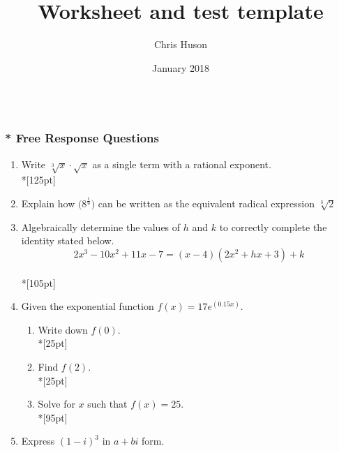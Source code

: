 \documentclass[12pt, oneside]{article}
\title{Worksheet and test template}
\author{Chris Huson}
\date{January 2018}
\begin{document}
\subsubsection*{\\* Free Response Questions}

\begin{enumerate}\addtocounter{enumi}{10}

\vspace{1 cm}

\item Write $\sqrt[3]{x} \cdot \sqrt{x}$ as a single term with a rational exponent.\\*[125pt]

\item Explain how  $\displaystyle \big( 8^\frac{1}{9} \big) $ can be written as the equivalent radical expression $\sqrt[3]2$

\newpage

\item Algebraically determine the values of $h$ and $k$ to correctly complete the identity stated below. \[2x^3-10x^2 +11x - 7 = (x - 4)(2x^2 + hx + 3) + k\]\\*[105pt]

\item Given the exponential function $\displaystyle f(x)=17e^{(0.15x)}$.
\begin{enumerate}
    \item Write down $f(0)$.\\*[25pt]
    \item Find $f(2)$.\\*[25pt]
    \item Solve for $x$ such that $f(x)=25$.\\*[95pt]
\end{enumerate}

\item Express $(1-i)^3 \text{ in } a+bi$ form. 

\end{enumerate}
\end{document}
